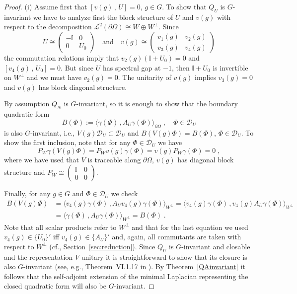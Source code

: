 \documentclass[a4paper,12pt]{amsart}
\newcommand{\scalarb}[2]{\langle#1\,,#2\rangle_{\partial \Omega}}
\newcommand{\scalarbw}[2]{\langle#1\,,#2\rangle_{W^\perp}}
\renewcommand{\L}{\mathcal{L}}
\newcommand{\D}{\mathcal{D}}
\newcommand{\pO}{{\partial \Omega}}
\newcommand{\1}{\mathbb{I}}
\numberwithin{equation}{section}
\numberwithin{theorem}{section}
\begin{document}
\begin{proof}
(i) Assume first that $[v (g)\,,\,U]=0$, $g\in G$. To show that $Q_U$ is $G$-invariant we have to analyze first the block structure of 
$U$ and $v(g)$ with respect to the decomposition
$
 \L^2(\pO)\cong W\oplus W^\perp
$.
Since
\[
U\cong 
\begin{pmatrix}
-\1 & 0 \\ 0 & U_0
\end{pmatrix}
\quad\mathrm{and}\quad
v(g)\cong
\begin{pmatrix}
v_1(g) & v_2(g) \\ v_3(g) & v_4(g)
\end{pmatrix}
\]
the commutation relations imply that $v_2(g)(\1+U_0)=0$ and $[v_4 (g)\,,\,U_0]=0$. But since $U$ has spectral gap at $-1$, then $\1+U_0$ is invertible
on $W^\perp$ and we must have $v_2(g)=0$. The unitarity of $v(g)$ implies $v_3(g)=0$ and $v(g)$ has block diagonal structure.  

By assumption $Q_N$ is $G$-invariant, so it is enough to show that the boundary quadratic form
\[
B(\Phi):=\scalarb{\gamma(\Phi)}{A_U\gamma(\Phi)}\;,\quad \Phi\in\D_U
\]
is also $G$-invariant, i.e., $V(g)\D_U\subset \D_U$ and $B(V(g)\Phi)=B(\Phi)$, $\Phi\in\D_U$.
To show the first inclusion, note that for any $\Phi\in\D_U$ we have 
\[
P_W\gamma(V(g)\Phi)=P_Wv(g) \gamma(\Phi)=v(g)P_W\gamma(\Phi)=0\;,
\]
where we have used that $V$ is traceable along $\pO$, $v(g)$ has diagonal block structure and 
$P_W\cong 
\begin{pmatrix}
\1 & 0 \\ 0 & 0
\end{pmatrix}$.

Finally, for any $g\in G$ and $\Phi\in\D_U$ we check 
\begin{align*}
B(V(g)\Phi)&=
\scalarbw{v_4(g)\gamma(\Phi)}{A_Uv_4 (g)\gamma(\Phi)}=\scalarbw{v_4 (g)\gamma(\Phi)}{v_4 (g)A_U\gamma(\Phi)}\\
&=\scalarbw{\gamma(\Phi)}{A_U\gamma(\Phi)}
=B(\Phi)\;.
\end{align*}
Note that all scalar products refer to $W^\perp$ and that for the last equation we used $v_4(g)\in\{U_0\}'$ iff
$v_4(g)\in\{A_U\}'$ and, again, all commutants are taken with respect to $W^\perp$ (cf., Section~\ref{sec:reduction}).
Since $Q_U$ is $G$-invariant and closable and the representation $V$ unitary it is straightforward to show that its
closure is also $G$-invariant (see, e.g., Theorem~VI.1.17 in \cite{kato95}). By Theorem~\ref{QAinvariant} it follows
that the self-adjoint extension of the minimal Laplacian representing the closed quadratic form will also be $G$-invariant.


\end{proof}
\end{document}
